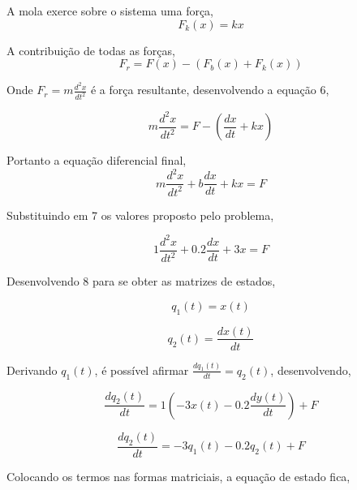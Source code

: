 \documentclass[a4paper, 10pt]{article}
\begin{document}
\begin{list}{\textbf{Questão .}}{
\setlength{\labelwidth}{-2mm} \setlength{\parsep}{0mm}
\setlength{\topsep}{0mm} \setlength{\leftmargin}{0mm}}
         A mola exerce sobre o sistema uma força,
         \begin{equation}
             F_k(x) = k x
         \end{equation}

         A contribuição de todas as forças,
        \begin{equation}
            F_r = F(x) - (F_b(x) + F_k(x))
        \end{equation}

        Onde $F_r = m \frac{d^2 x}{d t^2}$ é a força resultante, desenvolvendo a equação 6,

        $$ 
        m \frac{d^2 x}{d t^2} = F - \left(\frac{d x}{d t} + k x\right)
        $$

         Portanto a equação diferencial final, 
        \begin{equation} 
            m \frac{d^2 x}{d t^2} +  b \frac{d x}{d t} + k x = F
        \end{equation}

        Substituindo em 7 os valores proposto pelo problema,

        \begin{equation}
            1 \frac{d^2 x}{d t^2} +  0.2 \frac{d x}{d t} + 3 x = F
        \end{equation}
        
        Desenvolvendo 8 para se obter as matrizes de estados,
        
        \begin{equation}
        	q_1(t) = x(t)
        \end{equation}
        
        \begin{equation}
        	q_2(t) = \frac{d x(t)}{d t}
        \end{equation}
        
        Derivando $q_1(t)$, é possível afirmar $\frac{d q_1(t)}{d t} = q_2(t)$, desenvolvendo,
        
        \begin{equation}
        	\frac{d q_2(t)}{d t} = 1 \left(-3 x(t) - 0.2 \frac{d y(t)}{d t} \right) + F
        \end{equation}
        
        \begin{equation}
        	\frac{d q_2(t)}{d t} = -3 q_1(t) - 0.2 q_2(t) + F
        \end{equation}
        
        Colocando os termos nas formas matriciais, a equação de estado fica,
        

\end{list}
\end{document}
